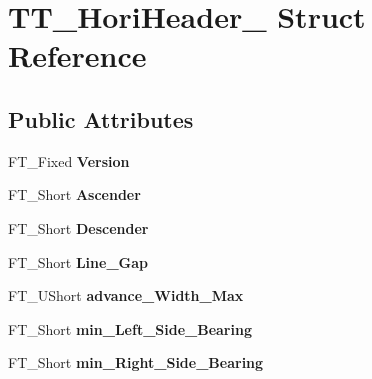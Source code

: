 \hypertarget{struct_t_t___hori_header__}{\section{T\-T\-\_\-\-Hori\-Header\-\_\- Struct Reference}
\label{struct_t_t___hori_header__}
}
\subsection*{Public Attributes}
\begin{DoxyCompactItemize}
\item 
\hypertarget{struct_t_t___hori_header___a2d0967448b63db392e35b566196fef97}{F\-T\-\_\-\-Fixed {\bfseries Version}}\label{struct_t_t___hori_header___a2d0967448b63db392e35b566196fef97}

\item 
\hypertarget{struct_t_t___hori_header___a6f987c89428c93854dab06e506134249}{F\-T\-\_\-\-Short {\bfseries Ascender}}\label{struct_t_t___hori_header___a6f987c89428c93854dab06e506134249}

\item 
\hypertarget{struct_t_t___hori_header___ad5be55a98dfaa079a2aaa462034a1512}{F\-T\-\_\-\-Short {\bfseries Descender}}\label{struct_t_t___hori_header___ad5be55a98dfaa079a2aaa462034a1512}

\item 
\hypertarget{struct_t_t___hori_header___a4165055ed05e42a2e5eed805bfe3fd7d}{F\-T\-\_\-\-Short {\bfseries Line\-\_\-\-Gap}}\label{struct_t_t___hori_header___a4165055ed05e42a2e5eed805bfe3fd7d}

\item 
\hypertarget{struct_t_t___hori_header___a1ddad7e4c5e6fed50c073745961814da}{F\-T\-\_\-\-U\-Short {\bfseries advance\-\_\-\-Width\-\_\-\-Max}}\label{struct_t_t___hori_header___a1ddad7e4c5e6fed50c073745961814da}

\item 
\hypertarget{struct_t_t___hori_header___a0e2e2bf8ca0e18b610c4eae0a647fded}{F\-T\-\_\-\-Short {\bfseries min\-\_\-\-Left\-\_\-\-Side\-\_\-\-Bearing}}\label{struct_t_t___hori_header___a0e2e2bf8ca0e18b610c4eae0a647fded}

\item 
\hypertarget{struct_t_t___hori_header___a64144cdd595e8e8de119b78539bf2fa7}{F\-T\-\_\-\-Short {\bfseries min\-\_\-\-Right\-\_\-\-Side\-\_\-\-Bearing}}\label{struct_t_t___hori_header___a64144cdd595e8e8de119b78539bf2fa7}


\end{DoxyCompactItemize}
